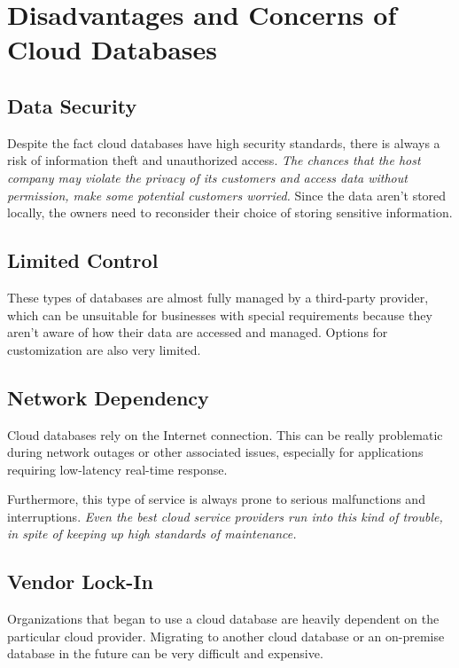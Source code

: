 \documentclass[12pt, a4paper]{article}
\begin{document}
\section{Disadvantages and Concerns of Cloud Databases}
    \subsection{Data Security}
        Despite the fact cloud databases have high security standards, there is always a risk of information theft and unauthorized access. \textit{The chances that the host company may violate the privacy of its customers and access data without permission, make some potential customers worried.}\cite{02} Since the data aren't stored locally, the owners need to reconsider their choice of storing sensitive information.

    \subsection{Limited Control}
        These types of databases are almost fully managed by a third-party provider, which can be unsuitable for businesses with special requirements because they aren't aware of how their data are accessed and managed. Options for customization are also very limited.
        
    \subsection{Network Dependency}
        Cloud databases rely on the Internet connection. This can be really problematic during network outages or other associated issues, especially for applications requiring low-latency real-time response.\par Furthermore, this type of service is always prone to serious malfunctions and interruptions. \textit{Even the best cloud service providers run into this kind of trouble, in spite of keeping up high standards of maintenance.}\cite{14}
        
    \subsection{Vendor Lock-In}
        Organizations that began to use a cloud database are heavily dependent on the particular cloud provider. Migrating to another cloud database or an on-premise database in the future can be very difficult and expensive.
    
\end{document}
